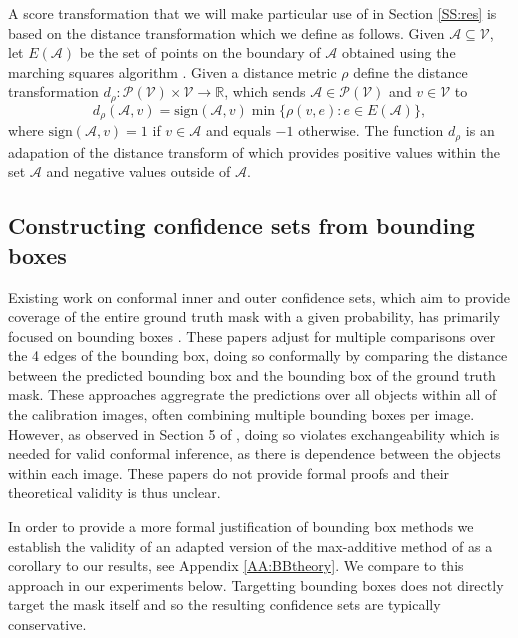 A score transformation that we will make particular use of in Section \ref{SS:res} is based on the distance transformation which we define as follows. Given $\mathcal{A} \subseteq \mathcal{V}$, let $E(\mathcal{A})$ be the set of points on the boundary of $\mathcal{A}$ obtained using the marching squares algorithm \citep{Maple2003}. Given a distance metric $\rho$ define the distance transformation $d_{\rho}: \mathcal{P}(\mathcal{V}) \times \mathcal{V}\rightarrow \mathbb{R}$, which sends $\mathcal{A} \in \mathcal{P}(\mathcal{V})$ and $v\in \mathcal{V}$ to
\begin{equation*}
	d_{\rho}(\mathcal{A}, v) = \text{sign}(\mathcal{A}, v)\min\lbrace \rho(v, e): e \in E(\mathcal{A})\rbrace, 
\end{equation*}
where $ \text{sign}(\mathcal{A}, v) = 1 $ if $v\in \mathcal{A}$ and equals $-1$ otherwise. The function $d_{\rho}$ is an adapation of the distance transform of \cite{Borgefors1986} which provides positive values within the set $\mathcal{A}$ and negative values outside of $\mathcal{A}$.

\subsection{Constructing confidence sets from bounding boxes}
Existing work on conformal inner and outer confidence sets, which aim to provide coverage of the entire ground truth mask with a given probability, has primarily focused on bounding boxes \citep{De2022, Andeol2023, Mukama2024}. These papers adjust for multiple comparisons over the 4 edges of the bounding box, doing so conformally by comparing the distance between the predicted bounding box and the bounding box of the ground truth mask. These approaches aggregrate the predictions over all objects within all of the calibration images, often combining multiple bounding boxes per image. However, as observed in Section 5 of \cite{De2022}, doing so violates exchangeability which is needed for valid conformal inference, as there is dependence between the objects within each image. These papers do not provide formal proofs and their theoretical validity is thus unclear.

In order to provide a more formal justification of bounding box methods we establish the validity of an adapted version of the max-additive method of \cite{Andeol2023} as a corollary to our results, see Appendix \ref{AA:BBtheory}. We compare to this approach in our experiments below. Targetting bounding boxes does not directly target the mask itself and so the resulting confidence sets are typically conservative.

